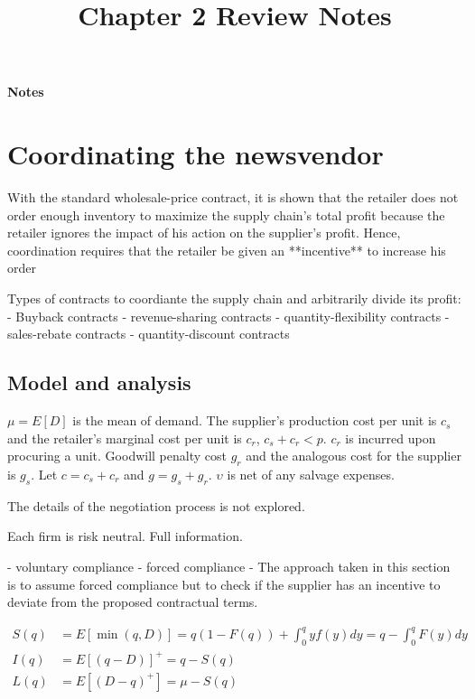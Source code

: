 \setcounter{section}{1}
\title{Chapter 2 Review Notes}

\thispagestyle{empty}

\begin{center}
{\LARGE \bf Notes}\\
\end{center}

\section{Coordinating the newsvendor}

With the standard wholesale-price contract, it is shown that the retailer does not order enough inventory to maximize the supply chain’s total profit because the retailer ignores the impact of his action on the supplier’s profit. Hence, coordination requires that the retailer be given an **incentive** to increase his order

Types of contracts to coordiante the supply chain and arbitrarily divide its profit:
- Buyback contracts
- revenue-sharing contracts
- quantity-flexibility contracts 
- sales-rebate contracts
- quantity-discount contracts


\subsection{Model and analysis}
$\mu=E[D]$ is the mean of demand. The supplier's production cost per unit is $c_s$ and the retailer's marginal cost per unit is $c_r$, $c_s+c_r<p$. $c_r$ is incurred upon procuring a unit. Goodwill penalty cost $g_r$ and the analogous cost for the supplier is $g_s$. Let $c=c_s+c_r$ and $g=g_s+g_r$. $\upsilon$ is net of any salvage expenses. 

The details of the negotiation process is not explored.

Each firm is risk neutral. Full information.

- voluntary compliance
- forced compliance
- The approach taken in this section is to assume forced compliance but to check if the supplier has an incentive to deviate from the proposed contractual terms.


\begin{align*}
    S(q)&=E[\min(q,D)]=q(1-F(q))+\int_0^q y f(y)dy=q-\int_0^q F(y)dy\\
    I(q)&=E[(q-D)]^+=q-S(q)\\
    L(q)&=E[(D-q)^+]=\mu-S(q)
\end{align*}

